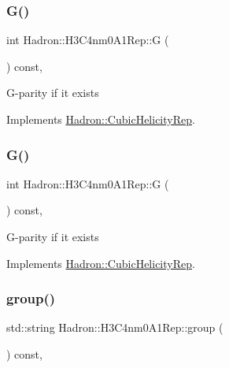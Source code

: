 \subsubsection{\texorpdfstring{G()}{G()}\hspace{0.1cm}{\footnotesize\ttfamily [1/2]}}
{\footnotesize\ttfamily int Hadron\+::\+H3\+C4nm0\+A1\+Rep\+::G (\begin{DoxyParamCaption}{ }\end{DoxyParamCaption}) const\hspace{0.3cm}{\ttfamily [inline]}, {\ttfamily [virtual]}}

G-\/parity if it exists 

Implements \mbox{\hyperlink{structHadron_1_1CubicHelicityRep_a50689f42be1e6170aa8cf6ad0597018b}{Hadron\+::\+Cubic\+Helicity\+Rep}}.

\mbox{\label{structHadron_1_1H3C4nm0A1Rep_a3810b23921892d986902dcacbd808705}} 
\subsubsection{\texorpdfstring{G()}{G()}\hspace{0.1cm}{\footnotesize\ttfamily [2/2]}}
{\footnotesize\ttfamily int Hadron\+::\+H3\+C4nm0\+A1\+Rep\+::G (\begin{DoxyParamCaption}{ }\end{DoxyParamCaption}) const\hspace{0.3cm}{\ttfamily [inline]}, {\ttfamily [virtual]}}

G-\/parity if it exists 

Implements \mbox{\hyperlink{structHadron_1_1CubicHelicityRep_a50689f42be1e6170aa8cf6ad0597018b}{Hadron\+::\+Cubic\+Helicity\+Rep}}.

\mbox{\label{structHadron_1_1H3C4nm0A1Rep_a031edbff97795d7fd225e9a3d70b5d8f}} 
\subsubsection{\texorpdfstring{group()}{group()}\hspace{0.1cm}{\footnotesize\ttfamily [1/3]}}
{\footnotesize\ttfamily std\+::string Hadron\+::\+H3\+C4nm0\+A1\+Rep\+::group (\begin{DoxyParamCaption}{ }\end{DoxyParamCaption}) const\hspace{0.3cm}{\ttfamily [inline]}, {\ttfamily [virtual]}}

